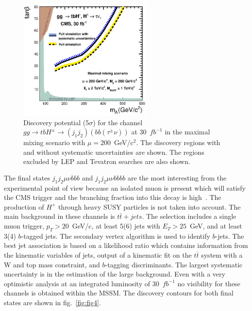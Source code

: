 \documentclass{cimento}
\begin{document}
\begin{figure}
\centering
\includegraphics[width=0.6\textwidth]{fig03.ps}

\caption{Discovery potential (5$\sigma$) for the channel $gg\rightarrow tbH^{\pm}\rightarrow (j_{1}j_{2})(bb(\tau^{\pm}\nu))$ at 30~$fb^{-1}$ in the maximal mixing scenario with
$\mu = 200$~GeV/c$^{2}$. The discovery regions with and without systematic uncertainties
are shown. The regions excluded by LEP and Tevatron searches are also shown.}
\label{fig:fig3}
\end{figure}


The final states $j_1j_2\mu\nu bbb$ and $j_1j_2\mu\nu bbbb$ are the most interesting
from the experimental point of view because an isolated muon is present which will satisfy the CMS
trigger and the branching fraction into this decay is high~\cite{ref:jetsAna}.
The production of $H^{+}$ through heavy SUSY particles is not taken into account.
The main background in these channels is $t\bar{t}+jets$. The selection includes
a single muon trigger, $p_{T}>20$~GeV/c, at least 5(6) jets with
$E_T>25$~GeV, and at least 3(4) $b$-tagged jets. The secondary vertex algorithm
is used to identify $b$-jets. The best jet association is based on a likelihood
ratio which contains information from the kinematic variables of jets, output of
a kinematic fit on the $t\bar{t}$ system with a W and top mass constraint, and
$b$-tagging discriminants. The largest systematic uncertainty is in the 
estimation of the large background. Even with a very optimistic analysis at an integrated luminosity of
30~$fb^{-1}$ no visibility for these channels is obtained within the MSSM. The
discovery contours for both final states are shown in fig.~\ref{fig:fig4}.
\end{document}
